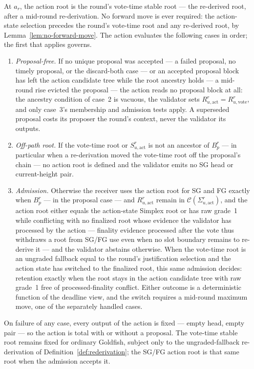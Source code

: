 \begin{definition}\label{def:action-root}
At \(a_r\), the action root is the round's vote-time stable root ---
the re-derived root, after a mid-round re-derivation.  No forward move
is ever required: the action-state selection precedes the round's
vote-time root and any re-derived root, by
Lemma~\ref{lem:no-forward-move}.  The action evaluates the following
cases in order; the first that applies governs.
\begin{enumerate}
 \item \emph{Proposal-free.}  If no unique proposal was accepted ---
   a failed proposal, no timely proposal, or the discard-both case ---
   or an accepted proposal block has left the action candidate tree
   while the root ancestry holds --- a mid-round rise evicted the
   proposal --- the action reads no proposal block at all: the ancestry
   condition of case~2 is vacuous, the validator sets
   \(R_{u,\mathrm{act}}^r=R_{u,\mathrm{vote}}^r\), and only
   case~3's membership and admission tests apply.  A superseded
   proposal costs its proposer the round's context, never the validator
   its outputs.
 \item \emph{Off-path root.}  If the vote-time root or
   \(S_{u,\mathrm{act}}^r\) is not an ancestor of \(B_p^r\) --- in
   particular when a re-derivation moved the vote-time root off the
   proposal's chain --- no action root is defined and the validator
   emits no SG head or current-height pair.
 \item \emph{Admission.}  Otherwise the receiver uses the action root
   for SG and FG exactly when \(B_p^r\) --- in the proposal case ---
   and \(R_{u,\mathrm{act}}^r\) remain in
   \(\mathcal C(\Sigma_{u,\mathrm{act}}^r)\), and the action root
   either equals the action-state Simplex root or has raw grade~1
   while conflicting with no finalized root whose evidence the
   validator has processed by the action --- finality evidence
   processed after the vote thus withdraws a root from SG/FG use even
   when no slot boundary remains to re-derive it --- and the validator
   abstains otherwise.  When the vote-time root is an ungraded
   fallback equal to the round's justification selection and the
   action state has switched to the finalized root, this same
   admission decides: retention exactly when the root stays in the
   action candidate tree with raw grade~1 free of processed-finality
   conflict.  Either outcome is a deterministic function of the
   deadline view, and the switch requires a mid-round maximum move,
   one of the separately handled cases.
\end{enumerate}
On failure of any case, every output of the action is fixed --- empty
head, empty pair --- so the action is total with or without a proposal.
The vote-time stable root remains fixed for ordinary Goldfish, subject
only to the ungraded-fallback re-derivation of
Definition~\ref{def:rederivation}; the SG/FG action root is that same
root when the admission accepts it.


\end{definition}
